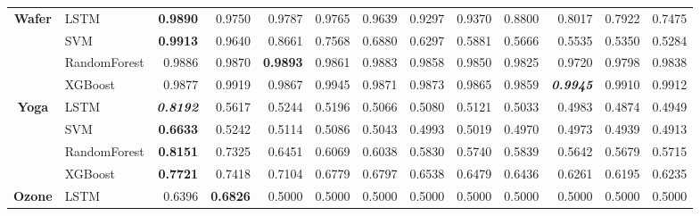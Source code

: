 \begin{table}[H]
\begin{adjustbox}{max width=12cm}
\begin{tabular}{|c|l|r|r|r|r|r|r|r|r|r|r|r|}
			\hline
			\textbf{Wafer}        & LSTM         & \textbf{0.9890}          & 0.9750                   & 0.9787          & 0.9765                   & 0.9639          & 0.9297 & 0.9370          & 0.8800                   & 0.8017                   & 0.7922          & 0.7475          \\
			                      & SVM          & \textbf{0.9913}          & 0.9640                   & 0.8661          & 0.7568                   & 0.6880          & 0.6297 & 0.5881          & 0.5666                   & 0.5535                   & 0.5350          & 0.5284          \\
			                      & RandomForest & 0.9886                   & 0.9870                   & \textbf{0.9893} & 0.9861                   & 0.9883          & 0.9858 & 0.9850          & 0.9825                   & 0.9720                   & 0.9798          & 0.9838          \\
			                      & XGBoost      & 0.9877                   & 0.9919                   & 0.9867          & 0.9945                   & 0.9871          & 0.9873 & 0.9865          & 0.9859                   & \textit{\textbf{0.9945}} & 0.9910          & 0.9912          \\
			\hline
			\textbf{Yoga}         & LSTM         & \textit{\textbf{0.8192}} & 0.5617                   & 0.5244          & 0.5196                   & 0.5066          & 0.5080 & 0.5121          & 0.5033                   & 0.4983                   & 0.4874          & 0.4949          \\
			                      & SVM          & \textbf{0.6633}          & 0.5242                   & 0.5114          & 0.5086                   & 0.5043          & 0.4993 & 0.5019          & 0.4970                   & 0.4973                   & 0.4939          & 0.4913          \\
			                      & RandomForest & \textbf{0.8151}          & 0.7325                   & 0.6451          & 0.6069                   & 0.6038          & 0.5830 & 0.5740          & 0.5839                   & 0.5642                   & 0.5679          & 0.5715          \\
			                      & XGBoost      & \textbf{0.7721}          & 0.7418                   & 0.7104          & 0.6779                   & 0.6797          & 0.6538 & 0.6479          & 0.6436                   & 0.6261                   & 0.6195          & 0.6235          \\
			\hline
			\textbf{Ozone}        & LSTM         & 0.6396                   & \textbf{0.6826}          & 0.5000          & 0.5000                   & 0.5000          & 0.5000 & 0.5000          & 0.5000                   & 0.5000                   & 0.5000          & 0.5000          \\

\end{tabular}
\end{adjustbox}
\end{table}
